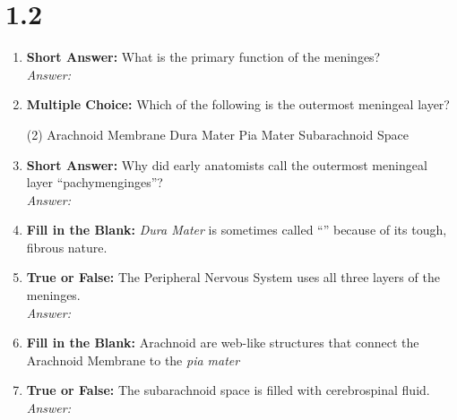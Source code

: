 \section*{1.2 \squigglyline}
\begin{enumerate}[label=\textbf{Q1.2.\arabic*}]
      \item \textbf{Short Answer:} What is the primary function of the meninges? \\
            \textit{Answer:} \\%

      \item \textbf{Multiple Choice:} Which of the following is the outermost meningeal layer?
            \begin{tasks}[label=(\Alph*), label-width=1.5em, item-indent=1.7em](2) %
                  \task Arachnoid Membrane
                  \task Dura Mater
                  \task Pia Mater
                  \task Subarachnoid Space
            \end{tasks}
      \item \textbf{Short Answer:} Why did early anatomists call the outermost meningeal layer ``pachymenginges''? \\
            \textit{Answer:} \\%

      \item \textbf{Fill in the Blank:} \textit{Dura Mater} is sometimes called ``\underline{\hspace{3cm}}'' because of its tough, fibrous nature.

      \item \textbf{True or False:} The Peripheral Nervous System uses all three layers of the meninges. \\
            \textit{Answer:} %

      \item \textbf{Fill in the Blank:} Arachnoid \underline{\hspace{3cm}} are web-like structures that connect the Arachnoid Membrane to the \textit{pia mater}

      \item \textbf{True or False:} The subarachnoid space is filled with cerebrospinal fluid. \\
            \textit{Answer:} %


\end{enumerate}
